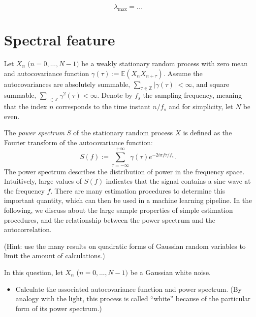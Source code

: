 \documentclass[11pt]{article}
\begin{document}
\begin{solution}  %

\begin{equation}
    \lambda_{\max} = \dots
\end{equation}

\end{solution}

\section{Spectral feature}

Let $X_n$ ($n=0,\dots,N-1)$ be a weakly stationary random process with zero mean and autocovariance function $\gamma(\tau):= \mathbb{E}(X_n X_{n+\tau})$.
Assume the autocovariances are absolutely summable, \ie $\sum_{\tau\in\mathbb{Z}} |\gamma(\tau)| < \infty$, and square summable, \ie $\sum_{\tau\in\mathbb{Z}} \gamma^2(\tau) < \infty$.
Denote by $f_s$ the sampling frequency, meaning that the index $n$ corresponds to the time instant $n / f_s$ and for simplicity, let $N$ be even.


The \textit{power spectrum} $S$ of the stationary random process $X$ is defined as the Fourier transform of the autocovariance function:
\begin{equation}
    S(f) := \sum_{\tau=-\infty}^{+\infty}\gamma(\tau)e^{-2i\pi f\tau/f_s}.
\end{equation}
The power spectrum describes the distribution of power in the frequency space.
Intuitively, large values of $S(f)$ indicates that the signal contains a sine wave at the frequency $f$.
There are many estimation procedures to determine this important quantity, which can then be used in a machine learning pipeline.
In the following, we discuss about the large sample properties of simple estimation procedures, and the relationship between the power spectrum and the autocorrelation.

(Hint: use the many results on quadratic forms of Gaussian random variables to limit the amount of calculations.)

\begin{exercise}
In this question, let $X_n$ ($n=0,\dots,N-1)$ be a Gaussian white noise.

\begin{itemize}
    \item Calculate the associated autocovariance function and power spectrum. (By analogy with the light, this process is called ``white'' because of the particular form of its power spectrum.)
\end{itemize}

\end{exercise}
\end{document}
